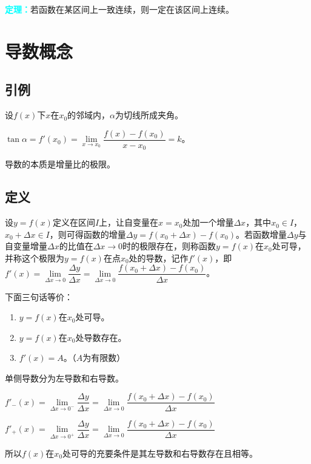 \documentclass[UTF8, 12pt]{ctexart}
\begin{document}
        \textcolor{aqua}{\textbf{定理：}}若函数在某区间上一致连续，则一定在该区间上连续。

        \section{导数概念}
        \subsection{引例}

        设$f(x)$下$x$在$x_0$的邻域内，$\alpha$为切线所成夹角。

        $\tan\alpha=f'(x_0)=\lim\limits_{x\to x_0}\dfrac{f(x)-f(x_0)}{x-x_0}=k$。

        导数的本质是增量比的极限。

        \subsection{定义}

        设$y=f(x)$定义在区间$I$上，让自变量在$x=x_0$处加一个增量$\Delta x$，其中$x_0\in I$，$x_0+\Delta x\in I$，则可得函数的增量$\Delta y=f(x_0+\Delta x)-f(x_0)$。若函数增量$\Delta y$与自变量增量$\Delta x$的比值在$\Delta x\to 0$时的极限存在，则称函数$y=f(x)$在$x_0$处可导，并称这个极限为$y=f(x)$在点$x_0$处的导数，记作$f'(x)$，即$f'(x)=\lim\limits_{\Delta x\to 0}\dfrac{\Delta y}{\Delta x}=\lim\limits_{\Delta x\to 0}\dfrac{f(x_0+\Delta x)-f(x_0)}{\Delta x}$。\medskip

        下面三句话等价：

        \begin{enumerate}
            \item $y=f(x)$在$x_0$处可导。
            \item $y=f(x)$在$x_0$处导数存在。
            \item $f'(x)=A$。（$A$为有限数）
        \end{enumerate}

        单侧导数分为左导数和右导数。\medskip

        $f'_-(x)=\lim\limits_{\Delta x\to 0^-}\dfrac{\Delta y}{\Delta x}=\lim\limits_{\Delta x\to 0}\dfrac{f(x_0+\Delta x)-f(x_0)}{\Delta x}$

        $f'_+(x)=\lim\limits_{\Delta x\to 0^+}\dfrac{\Delta y}{\Delta x}=\lim\limits_{\Delta x\to 0}\dfrac{f(x_0+\Delta x)-f(x_0)}{\Delta x}$\medskip

        所以$f(x)$在$x_0$处可导的充要条件是其左导数和右导数存在且相等。
\end{document}
